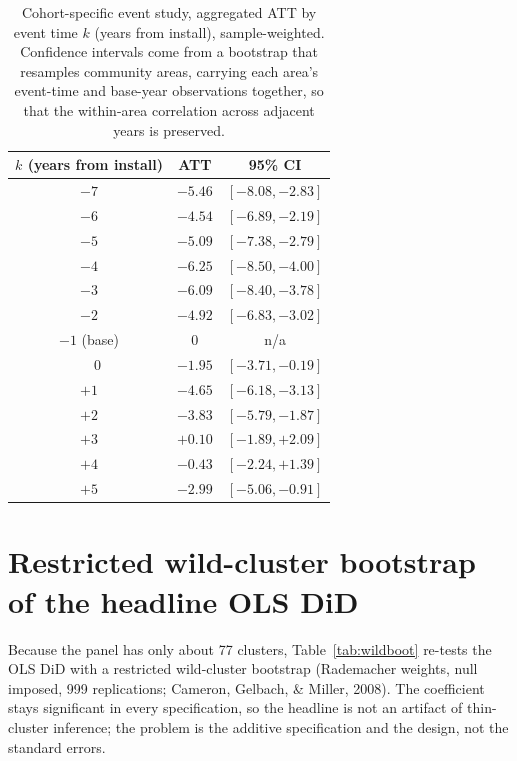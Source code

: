 \documentclass[12pt]{article}
\begin{document}
\begin{table}[H]
\centering
\small
\caption{Cohort-specific event study, aggregated ATT by event time $k$ (years from
install), sample-weighted. Confidence intervals come from a bootstrap that resamples
community areas, carrying each area's event-time and base-year observations together, so
that the within-area correlation across adjacent years is preserved.}
\label{tab:eventstudy}
\begin{tabular}{ccc}
\toprule
$k$ (years from install) & ATT & 95\% CI \\
\midrule
$-7$ & $-5.46$ & $[-8.08, -2.83]$ \\
$-6$ & $-4.54$ & $[-6.89, -2.19]$ \\
$-5$ & $-5.09$ & $[-7.38, -2.79]$ \\
$-4$ & $-6.25$ & $[-8.50, -4.00]$ \\
$-3$ & $-6.09$ & $[-8.40, -3.78]$ \\
$-2$ & $-4.92$ & $[-6.83, -3.02]$ \\
$-1$ (base) & $0$ & n/a \\
$\phantom{+}0$ & $-1.95$ & $[-3.71, -0.19]$ \\
$+1$ & $-4.65$ & $[-6.18, -3.13]$ \\
$+2$ & $-3.83$ & $[-5.79, -1.87]$ \\
$+3$ & $+0.10$ & $[-1.89, +2.09]$ \\
$+4$ & $-0.43$ & $[-2.24, +1.39]$ \\
$+5$ & $-2.99$ & $[-5.06, -0.91]$ \\
\bottomrule
\end{tabular}
\end{table}

\section{Restricted wild-cluster bootstrap of the headline OLS DiD}
\label{app:wildboot}

Because the panel has only about 77 clusters, Table~\ref{tab:wildboot} re-tests the OLS DiD
with a restricted wild-cluster bootstrap (Rademacher weights, null imposed, 999
replications; Cameron, Gelbach, \& Miller, 2008). The coefficient stays significant in every
specification, so the headline is not an artifact of thin-cluster inference; the problem is
the additive specification and the design, not the standard errors.
\end{document}
